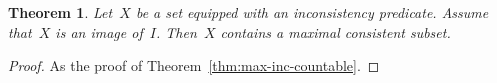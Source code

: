 \documentclass[com,11pt,crcready]{iosart2x}
\theoremstyle{definition}
\theoremstyle{plain}
\newtheorem{theorem}[definition]{Theorem}
\theoremstyle{remark}
\renewcommand{\_}{\mathpunct{.}\,}
\begin{document}
\begin{theorem}\label{thm:max-inc-wf}Let~$X$ be a set equipped
with an inconsistency predicate. Assume that~$X$ is an image of~$I$.
Then~$X$ contains a maximal consistent subset.\end{theorem}

\begin{proof}As the proof of Theorem~\ref{thm:max-inc-countable}.\end{proof}


\nocite{label}

\end{document}
